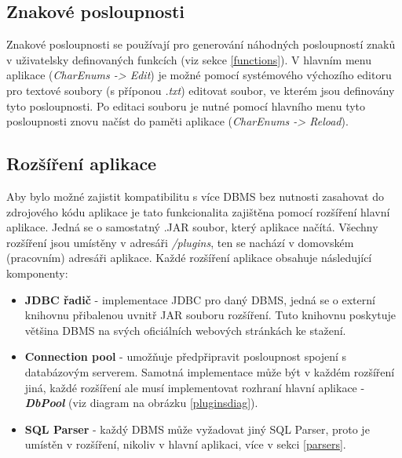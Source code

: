 \documentclass[czech,bachelor,public,dept460,male,cpdeclaration,twoside]{diploma}
\begin{document}
\subsection{Znakové posloupnosti} \label{charenums}
Znakové posloupnosti se používají pro generování náhodných posloupností znaků v uživatelsky definovaných funkcích (viz sekce \ref{functions}). V hlavním menu aplikace (\textit{CharEnums -> Edit}) je možné pomocí systémového výchozího editoru pro textové soubory (s příponou \textit{.txt}) editovat soubor, ve kterém jsou definovány tyto posloupnosti. Po editaci souboru je nutné pomocí hlavního menu tyto posloupnosti znovu načíst do paměti aplikace (\textit{CharEnums -> Reload}).

\subsection{Rozšíření aplikace} \label{plugins}
Aby bylo možné zajistit kompatibilitu s více DBMS bez nutnosti zasahovat do zdrojového kódu aplikace je tato funkcionalita zajištěna pomocí rozšíření hlavní aplikace. Jedná se o samostatný .JAR soubor, který aplikace načítá. Všechny rozšíření jsou umístěny v adresáři \textit{/plugins}, ten se nachází v domovském (pracovním) adresáři aplikace. Každé rozšíření aplikace obsahuje následující komponenty:
\begin{itemize}
\item \textbf{JDBC řadič} - implementace JDBC pro daný DBMS, jedná se o externí knihovnu přibalenou uvnitř JAR souboru rozšíření. Tuto knihovnu poskytuje většina DBMS na svých oficiálních webových stránkách ke stažení.
\item \textbf{Connection pool} - umožňuje předpřipravit posloupnost spojení s databázovým serverem. Samotná implementace může být v každém rozšíření jiná, každé rozšíření ale musí implementovat rozhraní hlavní aplikace - \textbf{\emph{DbPool}} (viz diagram na obrázku \ref{pluginsdiag}).
\item \textbf{SQL Parser} - každý DBMS může vyžadovat jiný SQL Parser, proto je umístěn v rozšíření, nikoliv v hlavní aplikaci, více v sekci \ref{parsers}. 
\end{itemize}
\end{document}
